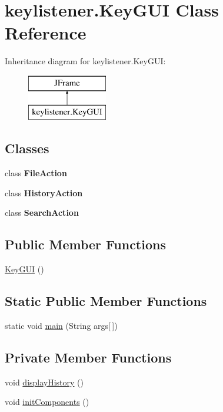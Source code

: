 \hypertarget{classkeylistener_1_1_key_g_u_i}{}\section{keylistener.\+Key\+G\+UI Class Reference}
\label{classkeylistener_1_1_key_g_u_i}
Inheritance diagram for keylistener.\+Key\+G\+UI\+:\begin{figure}[H]
\begin{center}
\leavevmode
\includegraphics[height=2.000000cm]{classkeylistener_1_1_key_g_u_i}
\end{center}
\end{figure}
\subsection*{Classes}
\begin{DoxyCompactItemize}
\item 
class {\bfseries File\+Action}
\item 
class {\bfseries History\+Action}
\item 
class {\bfseries Search\+Action}
\end{DoxyCompactItemize}
\subsection*{Public Member Functions}
\begin{DoxyCompactItemize}
\item 
\hyperlink{classkeylistener_1_1_key_g_u_i_af48eff8474974c6c21eb0c36feaf65ad}{Key\+G\+UI} ()
\end{DoxyCompactItemize}
\subsection*{Static Public Member Functions}
\begin{DoxyCompactItemize}
\item 
static void \hyperlink{classkeylistener_1_1_key_g_u_i_ac0043858e116673e920af7f1542f5376}{main} (String args\mbox{[}$\,$\mbox{]})
\end{DoxyCompactItemize}
\subsection*{Private Member Functions}
\begin{DoxyCompactItemize}
\item 
void \hyperlink{classkeylistener_1_1_key_g_u_i_aee81c72d2c77342da78a38116883cf6f}{display\+History} ()
\item 
void \hyperlink{classkeylistener_1_1_key_g_u_i_a43be7b88fdba1420ee3f0d1c2c4c2748}{init\+Components} ()
\end{DoxyCompactItemize}
